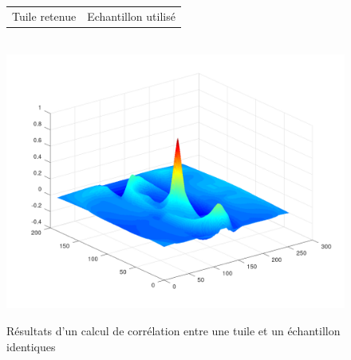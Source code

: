 \documentclass[a4paper,12pt,titlepage]{report}
\begin{document}
\begin{figure}[h!]
\begin{center}
\begin{tabular}{cc}
			Tuile retenue & Echantillon utilisé	\\	
			\end{tabular}\\
			\includegraphics[scale=0.22]{../illus/2corv.png}
		\end{center}
		\vspace{-2em}
		\caption{Résultats d'un calcul de corrélation entre une tuile et un échantillon identiques}
		\label{cor_idt}
	\end{figure}

	\vspace{2.5em}
\end{document}
